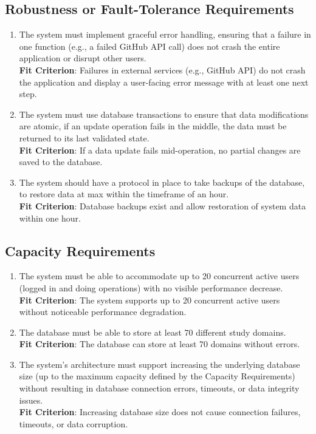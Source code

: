 \documentclass[12pt]{article}
\begin{document}
\subsection{Robustness or Fault-Tolerance Requirements}
\begin{enumerate}[label=PR-RFT\arabic*]
  \item The system must implement graceful error handling, ensuring that a failure in one function (e.g., a failed GitHub API call) does not crash the entire application or disrupt other users.
  \\ \textbf{Fit Criterion}: Failures in external services (e.g., GitHub API) do not crash the application and display a user-facing error message with at least one next step.
  \item The system must use database transactions to ensure that data modifications are atomic, if an update operation fails in the middle, the data must be returned to its last validated state.
  \\ \textbf{Fit Criterion}: If a data update fails mid-operation, no partial changes are saved to the database.
  \item The system should have a protocol in place to take backups of the database, to restore data at max within the timeframe of an hour.
  \\ \textbf{Fit Criterion}: Database backups exist and allow restoration of system data within one hour.
\end{enumerate}
\subsection{Capacity Requirements}
\begin{enumerate}[label=PR-CR\arabic*]
  \item The system must be able to accommodate up to 20 concurrent active users (logged in and doing operations) with no visible performance decrease.
  \\ \textbf{Fit Criterion}: The system supports up to 20 concurrent active users without noticeable performance degradation.
  \item The database must be able to store at least 70 different study domains.
  \\ \textbf{Fit Criterion}: The database can store at least 70 domains without errors.
  \item The system's architecture must support increasing the underlying database size (up to the maximum capacity defined by the Capacity Requirements) without resulting in database connection errors, timeouts, or data integrity issues.
  \\ \textbf{Fit Criterion}: Increasing database size does not cause connection failures, timeouts, or data corruption.
\end{enumerate}
\end{document}
